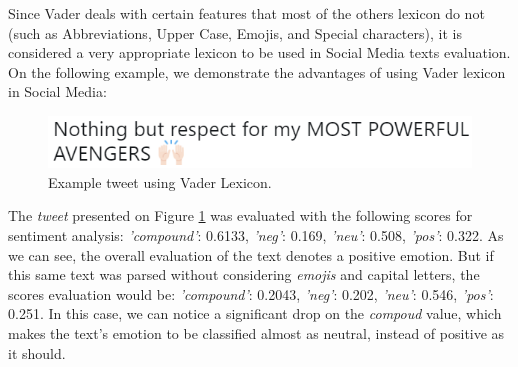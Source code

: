 Since Vader deals with certain features that most of the others lexicon do not (such as Abbreviations, Upper Case, Emojis, and Special characters), it is considered a very appropriate lexicon to be used in Social Media texts evaluation. On the following example, we demonstrate the advantages of using Vader lexicon in Social Media: 


\begin{figure}[h]
    \begin{center}
        \includegraphics[width=0.8\linewidth]{img/Twitter1.png}
    \end{center}
       \caption{Example tweet using Vader Lexicon.}
    \label{fig:tweet1}
\end{figure}

The \textit{tweet} presented on Figure \ref{fig:tweet1} was evaluated with the following scores for sentiment analysis: \textit{'compound'}: 0.6133, \textit{'neg'}: 0.169, \textit{'neu'}: 0.508, \textit{'pos'}: 0.322. As we can see, the overall evaluation of the text denotes a positive emotion. But if this same text was parsed without considering \textit{emojis} and capital letters, the scores evaluation would be: \textit{'compound'}: 0.2043, \textit{'neg'}: 0.202, \textit{'neu'}: 0.546, \textit{'pos'}: 0.251. In this case, we can notice a significant drop on the \textit{compoud} value, which makes the text's emotion to be classified almost as neutral, instead of positive as it should. 


